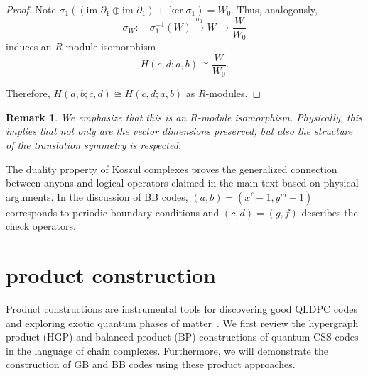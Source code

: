 \documentclass[aps,prl,english,superscriptaddress,twocolumn,tightenlines,showpacs,longbibliography,floatfix,amsfonts]{revtex4-2}
\newtheorem{rem}{Remark}
\begin{document}
\begin{proof}
	Note $\sigma_{1}\left(\left(\text{im }\partial_{1}\oplus\text{im }\partial_{1}\right)+\ker\sigma_{1}\right)=W_{0}$.
	Thus, analogously, 
	\begin{equation}
		\sigma_{W}:\quad\sigma_{1}^{-1}\left(W\right)\xrightarrow{\sigma_{1}}W\rightarrow\frac{W}{W_{0}}
	\end{equation}
	induces an $R$-module isomorphism
	\begin{equation}
		H\left(c,d;a,b\right)\cong\frac{W}{W_{0}}. 
	\end{equation}
	
	Therefore, $H\left(a,b;c,d\right)\cong H\left(c,d;a,b\right)$ as
	$R$-modules. 
\end{proof}

\begin{rem}
	We emphasize that this is an $R$-module isomorphism. Physically, this implies that not only are the vector dimensions preserved, but also the structure of the translation symmetry is respected.
\end{rem}

The duality property of Koszul complexes proves the generalized connection
between anyons and logical operators claimed in the main text based
on physical arguments. In the discussion of BB codes, $\left(a,b\right)=(x^{\ell}-1,y^{m}-1)$
corresponds to periodic boundary conditions and $\left(c,d\right)=\left(g,f\right)$
describes the check operators. 


\section{product construction}

Product constructions are instrumental tools for discovering good QLDPC codes and exploring exotic quantum phases of matter~\cite{Panteleev22,Panteleev22b,tan2023fracton}. We first review the hypergraph product (HGP) and balanced product (BP) constructions of quantum CSS
codes in the language of chain complexes. Furthermore, we will demonstrate the construction of GB and BB codes using these product approaches.
\end{document}
